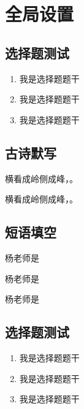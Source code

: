 \documentclass{ctexart}
\begin{document}
\section{全局设置}


\subsection{选择题测试}

\begin{enumerate}
  \item 我是选择题题干 
  \item 我是选择题题干 
  \item 我是选择题题干 
\end{enumerate}



\subsection{古诗默写}


横看成岭侧成峰，。

横看成岭侧成峰，。


\subsection{短语填空}

杨老师是 

杨老师是 

杨老师是 



\subsection{选择题测试}

\begin{enumerate}
  \item 我是选择题题干 
  \item 我是选择题题干 
  \item 我是选择题题干 
\end{enumerate}
\end{document}
